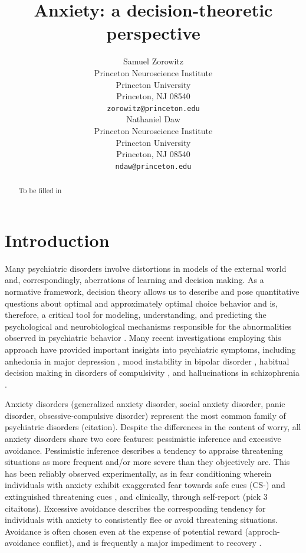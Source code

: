\documentclass[11pt]{article} %
\title{Anxiety: a decision-theoretic perspective}
\author{
Samuel Zorowitz \\
Princeton Neuroscience Institute\\
Princeton University\\
Princeton, NJ 08540 \\
\texttt{zorowitz@princeton.edu} \\
\And
Nathaniel Daw \\
Princeton Neuroscience Institute\\
Princeton University\\
Princeton, NJ 08540 \\
\texttt{ndaw@princeton.edu} \\
}
\begin{document}
\maketitle

\begin{abstract}
To be filled in
\end{abstract}


\startmain

\section{Introduction}
Many psychiatric disorders involve distortions in models of the external world
and, correspondingly, aberrations of learning and decision making. As a normative
framework, decision theory allows us to describe and pose quantita­tive questions
about optimal and approximately optimal choice behavior \cite{DayanDaw2008} and
is, therefore, a critical tool for modeling, understanding, and predicting the
psychological and neurobiological mechanisms responsible for the abnormalities
observed in psychiatric behavior \cite{HuysDawDayan2015}. Many recent investigations
employing this approach have provided important insights into psychiatric symptoms,
including anhedonia in major depression \cite{Rutledge2017}, mood instability
in bipolar disorder \cite{EldarNiv2015, EldarDolanNiv2016},  habitual decision
making in disorders of compulsivity \cite{gillan2016}, and hallucinations in
schizophrenia \cite{powers2017, corlett2018}.

Anxiety disorders (generalized anxiety disorder, social anxiety disorder, panic
disorder, obsessive-compulsive disorder) represent the most common family of
psychiatric disorders (citation). Despite the differences in the content of worry,
all anxiety disorders share two core features: pessimistic inference and excessive
avoidance. Pessimistic inference describes a tendency to appraise threatening
situations as more frequent and/or more severe than they objectively are. This has
been reliably observed experimentally, as in fear conditioning wherein individuals
with anxiety exhibit exaggerated fear towards safe cues (CS-) and extinguished
threatening cues \cite{lissek2005, Duits2015}, and clinically, through self-report
(pick 3 citaitons). Excessive avoidance describes the corresponding tendency for
individuals with anxiety to consistently flee or avoid threatening situations.
Avoidance is often chosen even at the expense of potential reward (approch-avoidance
conflict), and is frequently a major impediment to recovery \cite{Arnaudova2017}.
\end{document}
